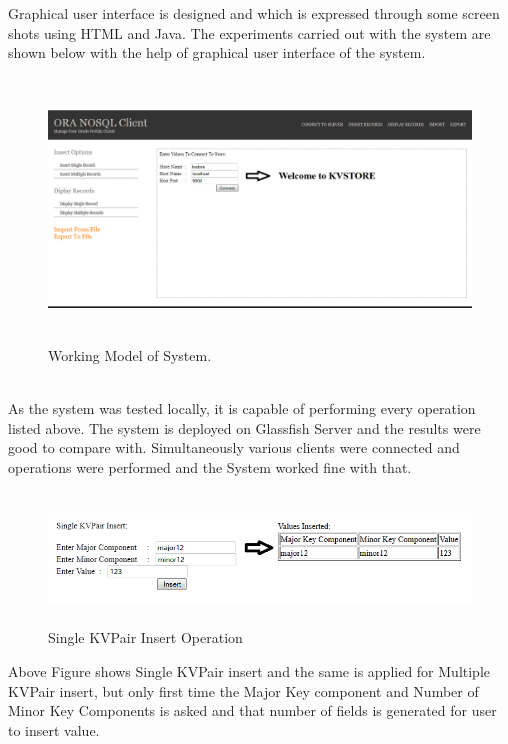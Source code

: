 \hspace*{0.7in} Graphical user interface is designed and which is expressed through some screen shots using HTML and Java. The experiments carried out with the system are shown below with the help of graphical user interface of the system.
\begin{figure}[h]
\centering
  \includegraphics[width=13cm,height=7cm]{ERD1.png}
  \caption{Working Model of System.}\label{Working Model of System.}
\end{figure} \\
As the system was tested locally, it is capable of performing every operation listed above. The system is deployed on Glassfish Server and the results were good to compare with. Simultaneously various clients were connected and operations were performed and the System worked fine with that.\\

\newpage
\begin{figure}[h]
\centering
  \includegraphics[width=13cm,height=3.5cm]{ERD2.png}
  \caption{Single KVPair Insert Operation}\label{Single KVPair Insert Operation}
\end{figure}
Above Figure shows Single KVPair insert and the same is applied for Multiple KVPair insert, but only first time the Major Key component and Number of Minor Key Components is asked and that number of fields is generated for user to insert value.

